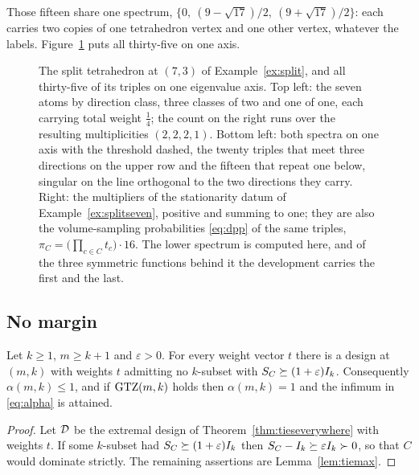 Those fifteen share one spectrum,
$\bigl\{0,\ (9-\sqrt{17})/2,\ (9+\sqrt{17})/2\bigr\}$: each carries two copies
of one tetrahedron vertex and one other vertex, whatever the labels.
Figure~\ref{fig:splitspec} puts all thirty-five on one axis.

\begin{figure}[ht]
  \centering
  
  \caption{The split tetrahedron at $(7,3)$ of Example~\ref{ex:split}, and all
  thirty-five of its triples on one eigenvalue axis.  Top left: the seven atoms
  by direction class, three classes of two and one of one, each carrying total
  weight $\tfrac14$; the count on the right runs over the resulting
  multiplicities $(2,2,2,1)$.  Bottom left: both spectra on one axis with the
  threshold dashed, the twenty triples that meet three directions on the upper
  row and the fifteen that repeat one below, singular on the line orthogonal to
  the two directions they carry.  Right: the multipliers of the stationarity
  datum of Example~\ref{ex:splitseven}, positive and summing to one; they are
  also the volume-sampling probabilities \eqref{eq:dpp} of the same triples,
  $\pi_C=\bigl(\prod_{c\in C}t_c\bigr)\cdot16$.  The lower spectrum is computed
  here, and of the three symmetric functions behind it the development carries
  the first and the last.}
  \label{fig:splitspec}
\end{figure}

\subsection{No margin}\label{sec:nomargin}

\begin{corollary}[Lean]\label{cor:nomargin}
Let $k\ge1$, $m\ge k+1$ and $\varepsilon>0$.  For every weight vector $t$
there is a design at $(m,k)$ with weights $t$ admitting no $k$-subset with
$S_{C}\succeq(1+\varepsilon)I_k$.  Consequently $\alpha(m,k)\le1$, and if
$\mathrm{GTZ}(m,k)$ holds then $\alpha(m,k)=1$ and the infimum in
\eqref{eq:alpha} is attained.
\end{corollary}

\begin{proof}
Let $\mathcal{D}$ be the extremal design of Theorem~\ref{thm:tieseverywhere} with
weights $t$.  If some $k$-subset had $S_{C}\succeq(1+\varepsilon)I_k$ then
$S_{C}-I_k\succeq\varepsilon I_k\succ0$, so that $C$ would dominate strictly.
The remaining assertions are Lemma~\ref{lem:tiemax}.
\end{proof}


